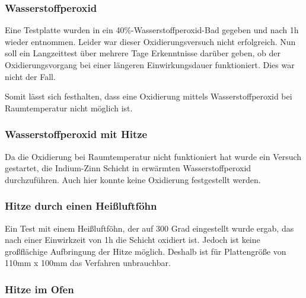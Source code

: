 

\subsubsection{Wasserstoffperoxid}


Eine Testplatte wurden in ein 40\%-Wasserstoffperoxid-Bad gegeben und nach 1h wieder entnommen. Leider war dieser Oxidierungsversuch nicht erfolgreich.
Nun soll ein Langzeittest über mehrere Tage Erkenntnisse darüber geben, ob der Oxidierungsvorgang bei einer längeren Einwirkungsdauer funktioniert. Dies war nicht der Fall.

Somit lässt sich festhalten, dass eine Oxidierung mittels Wasserstoffperoxid bei Raumtemperatur nicht möglich ist.

\subsubsection{Wasserstoffperoxid mit Hitze}

Da die Oxidierung bei Raumtemperatur nicht funktioniert hat wurde ein Versuch gestartet, die Indium-Zinn Schicht in erwärmten Wasserstoffperoxid durchzuführen. Auch hier konnte keine Oxidierung festgestellt werden.

\subsubsection{Hitze durch einen Heißluftföhn}

Ein Test mit einem Heißluftföhn, der auf 300 Grad eingestellt wurde ergab, das nach einer Einwirkzeit von 1h die Schicht oxidiert ist. Jedoch ist keine großflächige Aufbringung der Hitze möglich. Deshalb ist für Plattengröße von 110mm x 100mm das Verfahren unbrauchbar.

\subsubsection{Hitze im Ofen}

